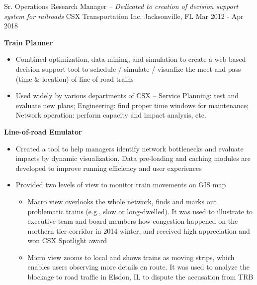 \begin{cventries}

\cventry
{Sr. Operations Research Manager \textit{ -- Dedicated to creation of decision support system for railroads}}            %
{CSX Transportation Inc. }                %
{Jacksonville, FL}                       %
{Mar 2012 - Apr 2018}                     %
{
    \begin{cvitems}
    \item {
        \textbf{Train Planner} 
        \begin{itemize}
            \item  Combined optimization, data-mining, and simulation to create a web-based decision support tool to schedule / simulate / visualize the meet-and-pass (time \& location) of line-of-road trains 
            \item  Used widely by various departments of CSX -- Service Planning: test and evaluate new plans; Engineering: find proper time windows for maintenance; Network operation: perform capacity and impact analysis, etc.
        \end{itemize}           
    }
    \item {
        \textbf{Line-of-road Emulator} 
        \begin{itemize}
        \item  Created a tool to help managers identify network bottlenecks and evaluate impacts by dynamic visualization. 
               Data pre-loading and caching modules are developed to improve running efficiency and user experiences
        \item  Provided two levels of view to monitor train movements on GIS map  
        \begin{itemize}
            \item  Macro view overlooks the whole network, finds and marks out problematic trains (e.g., slow or long-dwelled). 
                   It was used to illustrate to executive team and board members how congestion happened on the northern tier corridor in 2014 winter, 
                   and received high appreciation and won CSX Spotlight award
            \item  Micro view zooms to local and shows trains as moving strips, which enables users observing more details en route. 
                   It was used to analyze the blockage to road traffic in Elsdon, IL to dispute the accusation from TRB

\end{itemize}
\end{itemize}}
\end{cvitems}}
\end{cventries}
